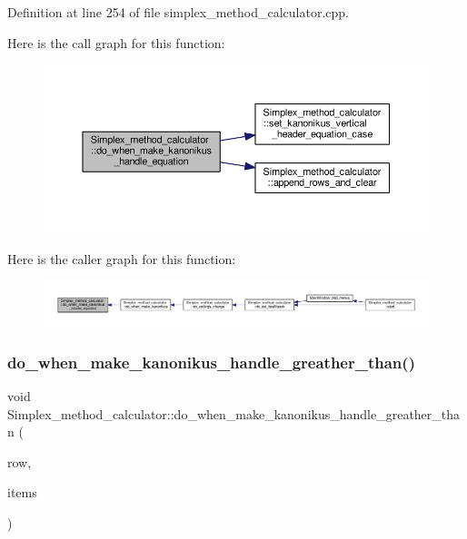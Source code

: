 Definition at line 254 of file simplex\+\_\+method\+\_\+calculator.\+cpp.

Here is the call graph for this function\+:\nopagebreak
\begin{figure}[H]
\begin{center}
\leavevmode
\includegraphics[width=350pt]{classSimplex__method__calculator_a6a697c5e4aff9902f3aea4cf773a7bca_cgraph}
\end{center}
\end{figure}
Here is the caller graph for this function\+:\nopagebreak
\begin{figure}[H]
\begin{center}
\leavevmode
\includegraphics[width=350pt]{classSimplex__method__calculator_a6a697c5e4aff9902f3aea4cf773a7bca_icgraph}
\end{center}
\end{figure}
\mbox{\label{classSimplex__method__calculator_abe265923af8974d3e865d22bcae47b7b}} 
\subsubsection{\texorpdfstring{do\+\_\+when\+\_\+make\+\_\+kanonikus\+\_\+handle\+\_\+greather\+\_\+than()}{do\_when\_make\_kanonikus\_handle\_greather\_than()}}
{\footnotesize\ttfamily void Simplex\+\_\+method\+\_\+calculator\+::do\+\_\+when\+\_\+make\+\_\+kanonikus\+\_\+handle\+\_\+greather\+\_\+than (\begin{DoxyParamCaption}\item[{int}]{row,  }\item[{Q\+List$<$ Q\+Standard\+Item $\ast$$>$}]{items }\end{DoxyParamCaption})\hspace{0.3cm}{\ttfamily [private]}}



